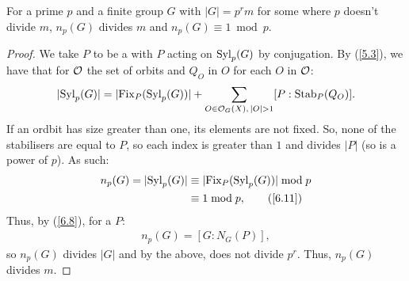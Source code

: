 For a prime $p$ and a finite group $G$ with
$|G| = p^rm$ for some where $p$ doesn't divide $m$, 
$n_p(G)$ divides $m$ and $n_p(G) \equiv 1 \bmod p$.

\begin{proof}
    We take $P$ to be a \Syls with $P$ acting on $\operatorname{Syl}_p(G)$
    by conjugation. By (\ref{5.3}), we have that
    for $\mathcal{O}$ the set of orbits and
    $Q_O$ in $O$ for each $O$ in $\mathcal{O}$: \begin{align*}
        |\!\operatorname{Syl}_p(G)| = 
        |\!\operatorname{Fix}_P(\operatorname{Syl}_p(G))| 
        + \sum_{O \in \mathcal{O}_G(X), \, |O| > 1} 
            [P : \operatorname{Stab}_P(Q_O)].
    \end{align*} If an ordbit has size greater than one,
    its elements are not fixed. So, none of the stabilisers
    are equal to $P$, so each index is greater than $1$
    and divides $|P|$ (so is a power of $p$). As such: 
    \begin{align*}
        n_p(G) = |\!\Syl_p(G)| 
        &\equiv |\!\Fix_P(\Syl_p(G))| \bmod p \\
        &\equiv 1 \bmod p, \tag{\ref{6.11}}
    \end{align*} Thus, by (\ref{6.8}), for a
    \Syls $P$: \begin{align*}
        n_p(G) = [G : N_G(P)],
    \end{align*} so $n_p(G)$ divides $|G|$ and by the above,
    does not divide $p^r$. Thus, $n_p(G)$ divides $m$.
\end{proof}
